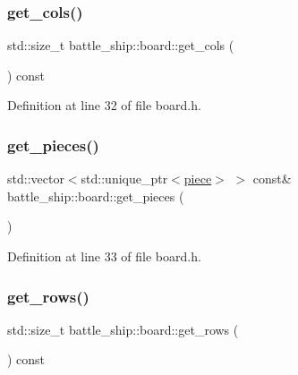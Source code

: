 \mbox{\label{classbattle__ship_1_1board_ad3d5995d4b8a0af0cfc802a1731f6a6d}} 
\subsubsection{\texorpdfstring{get\+\_\+cols()}{get\_cols()}}
{\footnotesize\ttfamily std\+::size\+\_\+t battle\+\_\+ship\+::board\+::get\+\_\+cols (\begin{DoxyParamCaption}{ }\end{DoxyParamCaption}) const\hspace{0.3cm}{\ttfamily [inline]}}



Definition at line 32 of file board.\+h.

\mbox{\label{classbattle__ship_1_1board_ae621b104b6547d5648eca21c90d43609}} 
\subsubsection{\texorpdfstring{get\+\_\+pieces()}{get\_pieces()}}
{\footnotesize\ttfamily std\+::vector$<$std\+::unique\+\_\+ptr$<$\hyperlink{classbattle__ship_1_1piece}{piece}$>$ $>$ const\& battle\+\_\+ship\+::board\+::get\+\_\+pieces (\begin{DoxyParamCaption}{ }\end{DoxyParamCaption})\hspace{0.3cm}{\ttfamily [inline]}}



Definition at line 33 of file board.\+h.

\mbox{\label{classbattle__ship_1_1board_a74cf4399466cad172160f005da6d45fa}} 
\subsubsection{\texorpdfstring{get\+\_\+rows()}{get\_rows()}}
{\footnotesize\ttfamily std\+::size\+\_\+t battle\+\_\+ship\+::board\+::get\+\_\+rows (\begin{DoxyParamCaption}{ }\end{DoxyParamCaption}) const\hspace{0.3cm}{\ttfamily [inline]}}



